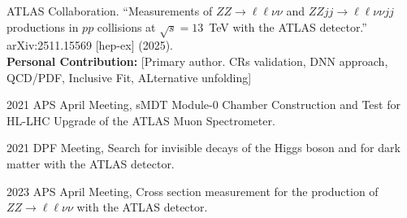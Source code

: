 \begin{achievements}
  \begin{theachievements}[待发表论文]
    \item ATLAS Collaboration. ``Measurements of $ZZ \rightarrow \ell\ell\nu\nu$ and $ZZjj \rightarrow \ell\ell\nu\nu jj$ productions in $pp$ collisions at $\sqrt{s}=13$~TeV with the ATLAS detector.'' arXiv:2511.15569 [hep-ex] (2025). 
    \\ \textbf{Personal Contribution:} [Primary author. CRs validation, DNN approach, QCD/PDF, Inclusive Fit, ALternative unfolding]
  \end{theachievements}

  \begin{theachievements}[会议报告]
    \item 2021 APS April Meeting, sMDT Module-0 Chamber Construction and Test for HL-LHC Upgrade of the ATLAS Muon Spectrometer. 
    \item 2021 DPF Meeting, Search for invisible decays of the Higgs boson and for dark matter with the ATLAS detector. 
    \item 2023 APS April Meeting, Cross section measurement for the production of $ZZ \rightarrow \ell\ell\nu\nu$ with the ATLAS detector. 
  \end{theachievements}

\end{achievements}


